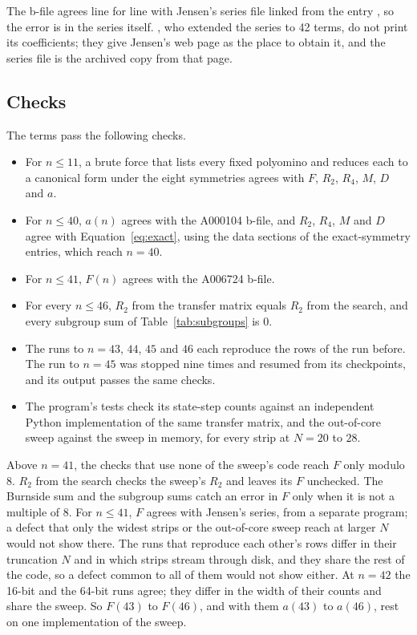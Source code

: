 \documentclass[11pt]{a000104}
\numberwithin{equation}{section}
\begin{document}
The b-file agrees line for line with Jensen's series file linked from the entry \parencite{Jensen:squareareaser}, so the error is in the series itself.
\textcite{GuttmannJensenWongEnting:2000}, who extended the series to 42 terms, do not print its coefficients; they give Jensen's web page as the place to obtain it, and the series file is the archived copy from that page.

\subsection{Checks}\label{sec:checks}

The terms pass the following checks.
\begin{itemize}
  \item For $n \le 11$, a brute force that lists every fixed polyomino and reduces each to a canonical form under the eight symmetries agrees with $F$, $R_2$, $R_4$, $M$, $D$ and $a$.
  \item For $n \le 40$, $a(n)$ agrees with the A000104 b-file, and $R_2$, $R_4$, $M$ and $D$ agree with Equation~\eqref{eq:exact}, using the data sections of the exact-symmetry entries, which reach $n = 40$.
  \item For $n \le 41$, $F(n)$ agrees with the A006724 b-file.
  \item For every $n \le 46$, $R_2$ from the transfer matrix equals $R_2$ from the search, and every subgroup sum of Table~\ref{tab:subgroups} is $0$.
  \item The runs to $n = 43$, $44$, $45$ and $46$ each reproduce the rows of the run before. The run to $n = 45$ was stopped nine times and resumed from its checkpoints, and its output passes the same checks.
  \item The program's tests check its state-step counts against an independent Python implementation of the same transfer matrix, and the out-of-core sweep against the sweep in memory, for every strip at $N = 20$ to $28$.
\end{itemize}

Above $n = 41$, the checks that use none of the sweep's code reach $F$ only modulo 8.
$R_2$ from the search checks the sweep's $R_2$ and leaves its $F$ unchecked.
The Burnside sum and the subgroup sums catch an error in $F$ only when it is not a multiple of 8.
For $n \le 41$, $F$ agrees with Jensen's series, from a separate program; a defect that only the widest strips or the out-of-core sweep reach at larger $N$ would not show there.
The runs that reproduce each other's rows differ in their truncation $N$ and in which strips stream through disk, and they share the rest of the code, so a defect common to all of them would not show either.
At $n = 42$ the 16-bit and the 64-bit runs agree; they differ in the width of their counts and share the sweep.
So $F(43)$ to $F(46)$, and with them $a(43)$ to $a(46)$, rest on one implementation of the sweep.
\end{document}
